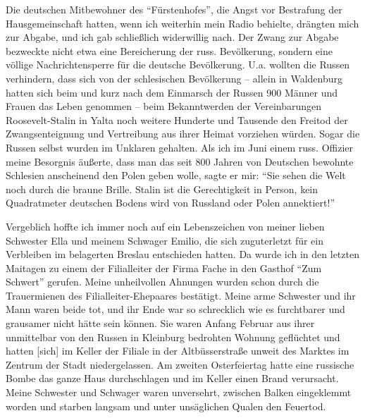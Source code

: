 \documentclass[a5paper,pagesize,10pt,twoside=true]{scrbook}
\renewcommand{\marginpar}[2][]{}
\begin{document}
\marginpar{82} Die deutschen Mitbewohner des \enquote{Fürstenhofes}, die Angst vor Bestrafung der Hausgemeinschaft hatten, wenn ich weiterhin mein Radio behielte, drängten mich zur Abgabe, und ich gab schließlich widerwillig nach. Der Zwang zur Abgabe bezweckte nicht etwa eine Bereicherung der russ. Bevölkerung, sondern eine völlige Nachrichtensperre für die deutsche Bevölkerung. U.a. wollten die Russen verhindern, dass sich von der schlesischen Bevölkerung -- allein in Waldenburg hatten sich beim und kurz nach dem Einmarsch der Russen 900 Männer und Frauen das Leben genommen -- beim Bekanntwerden der Vereinbarungen Roosevelt-Stalin in Yalta noch weitere Hunderte und Tausende den Freitod der Zwangsenteignung und Vertreibung aus ihrer Heimat vorziehen würden. Sogar die Russen selbst wurden im Unklaren gehalten. Als ich im Juni einem russ. Offizier meine Besorgnis äußerte, dass man das seit 800 Jahren von Deutschen bewohnte Schlesien anscheinend den Polen geben wolle, sagte er mir: \enquote{Sie sehen die Welt noch durch die braune Brille. Stalin ist die Gerechtigkeit \marginpar{83} in Person, kein Quadratmeter deutschen Bodens wird von Russland oder Polen annektiert!}

Vergeblich hoffte ich immer noch auf ein Lebenszeichen von meiner lieben Schwester Ella und meinem Schwager Emilio, die sich zuguterletzt für ein Verbleiben im belagerten Breslau entschieden hatten. Da wurde ich in den letzten Maitagen zu einem der Filialleiter der Firma Fache in den Gasthof \enquote{Zum Schwert} gerufen. Meine unheilvollen Ahnungen wurden schon durch die Trauermienen des Filialleiter-Ehepaares bestätigt. Meine arme Schwester und ihr Mann waren beide tot, und ihr Ende war so schrecklich wie es furchtbarer und grausamer nicht hätte sein können. Sie waren Anfang Februar aus ihrer unmittelbar von den Russen in Kleinburg bedrohten Wohnung geflüchtet und hatten [sich] im Keller der Filiale in der Altbüsserstraße unweit des Marktes im Zentrum der Stadt niedergelassen. Am zweiten Osterfeiertag hatte eine russische Bombe das ganze Haus durchschlagen und im Keller einen Brand verursacht. Meine Schwester und Schwager waren unversehrt, zwischen Balken eingeklemmt worden und starben langsam und unter unsäglichen Qualen den Feuertod.
\end{document}
